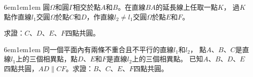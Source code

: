 \documentclass[12pt]{article}
\begin{document}
\begin{mybox}[例題\thesubsection-1]{6em}{1em}{1em}
    圓$\Omega$和圓$\Gamma$相交於點$A$和$B$。在直線$BA$的延長線上任取一點$K$，
    過$K$點作直線$l_1$交圓$\Omega$於點$C$和$D$，作直線$l_2\neq l_1$交圓$\Omega$於點$E$和$F$。
    
    求證：$C$、$D$、$E$、$F$四點共圓。
\end{mybox}

\begin{mybox}[例題\thesubsection-2]{6em}{1em}{1em}
    同一個平面內有兩條不重合且不平行的直線$l_1$和$l_2$，
    點$A$、$B$、$C$是直線$l_1$上的三個相異點，點$D$、$E$和$F$是直線$l_2$上的三個相異點。
    已知$A$、$B$、$D$、$E$四點共圓，$AD\parallel CF$。求證：$B$、$C$、$E$、$F$四點共圓。
\end{mybox}

\newpage
\end{document}
